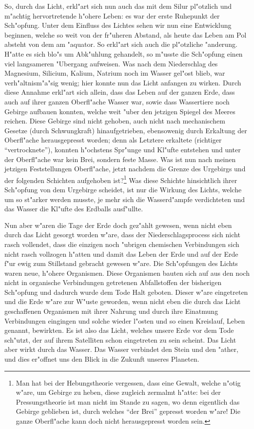 \documentclass[a4paper, 11pt, oneside]{article}
\begin{document}
So, durch das Licht, erkl"art sich nun auch das mit dem Silur pl"otzlich und m"achtig hervortretende h"ohere Leben: es war der erste Ruhepunkt der Sch"opfung. Unter dem Einfluss des Lichtes sehen wir nun eine Entwicklung beginnen, welche so weit von der fr"uheren Abstand, als heute das Leben am Pol absteht von dem am "aquator. So erkl"art sich auch die pl"otzliche "anderung. H"atte es sich blo"s um Abk"uhlung gehandelt, so m"usste die Sch"opfung einen viel langsameren "Ubergang aufweisen. Was nach dem Niederschlag des Magnesium, Silicium, Kalium, Natrium noch im Wasser gel"ost blieb, war verh"altnism"a"sig wenig; hier konnte nun das Licht anfangen zu wirken. Durch diese Annahme erkl"art sich allein, dass das Leben auf der ganzen Erde, dass auch auf ihrer ganzen Oberfl"ache Wasser war, sowie dass Wassertiere noch Gebirge aufbauen konnten, welche weit "uber den jetzigen Spiegel des Meeres reichen. Diese Gebirge sind nicht gehoben, auch nicht nach mechanischem Gesetze (durch Schwungkraft) hinaufgetrieben, ebensowenig durch Erkaltung der Oberfl"ache herausgepresst worden; denn als Letztere erkaltete (richtiger "`vertrocknete"'), konnten h"ochstens Spr"unge und Kl"ufte entstehen und unter der Oberfl"ache war kein Brei, sondern feste Masse. Was ist nun nach meinen jetzigen Feststellungen Oberfl"ache, jetzt nachdem die Grenze des Urgebirgs und der folgenden Schichten aufgehoben ist?\footnote{Man hat bei der Hebungstheorie vergessen, dass eine Gewalt, welche n"otig w"are, um Gebirge zu heben, diese zugleich zermalmt h"atte: bei der Pressungstheorie ist man nicht im Stande zu sagen, wo denn eigentlich das Gebirge geblieben ist, durch welches "`der Brei"' gepresst worden w"are! Die ganze Oberfl"ache kann doch nicht herausgepresst worden sein.} Was diese Schichte hinsichtlich ihrer Sch"opfung von dem Urgebirge scheidet, ist nur die Wirkung des Lichts, welche um so st"arker werden musste, je mehr sich die Wasserd"ampfe verdichteten und das Wasser die Kl"ufte des Erdballs ausf"ullte.

Nun aber w"aren die Tage der Erde doch gez"ahlt gewesen, wenn nicht eben durch das Licht gesorgt worden w"are, dass der Niederschlagsprocess sich nicht rasch vollendet, dass die einzigen noch "ubrigen chemischen Verbindungen sich nicht rasch vollzogen h"atten und damit das Leben der Erde und auf der Erde f"ur ewig zum Stillstand gebracht gewesen w"are. Die Sch"opfungen des Lichts waren neue, h"ohere Organismen. Diese Organismen bauten sich auf aus den noch nicht in organische Verbindungen getretenen Abfallstoffen der bisherigen Sch"opfung und dadurch wurde dem Tode Halt geboten. Dieser w"are eingetreten und die Erde w"are zur W"uste geworden, wenn nicht eben die durch das Licht geschaffenen Organismen mit ihrer Nahrung und durch ihre Einatmung Verbindungen eingingen und solche wieder l"osten und so einen Kreislauf, Leben genannt, bewirkten. Es ist also das Licht, welches unsere Erde vor dem Tode sch"utzt, der auf ihrem Satelliten schon eingetreten zu sein scheint. Das Licht aber wirkt durch das Wasser. Das Wasser verbindet den Stein und den "ather, und dies er"offnet uns den Blick in die Zukunft unseres Planeten.
\clearpage
\end{document}
